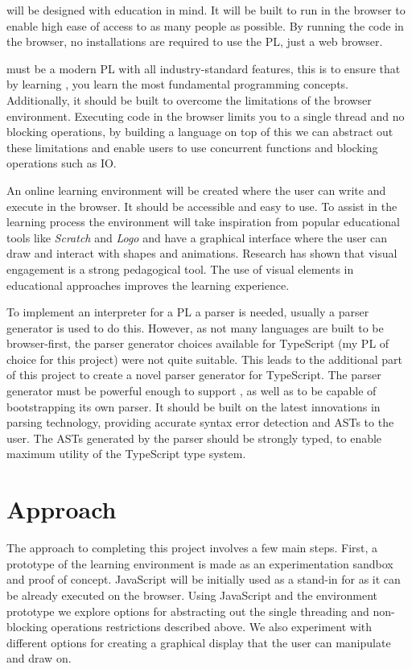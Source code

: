 \Setanta{} will be designed with education in mind.
It will be built to run in the browser to enable high ease of access to as many people as possible.
By running the code in the browser, no installations are required to use the PL, just a web browser.

\Setanta{} must be a modern PL with all industry-standard features, this is to ensure that by learning \Setanta{}, you learn the most fundamental programming concepts.
Additionally, it should be built to overcome the limitations of the browser environment.
Executing code in the browser limits you to a single thread and no blocking operations, by building a language on top of this we can abstract out these limitations and enable users to use concurrent functions and blocking operations such as IO.

An online learning environment will be created where the user can write and execute \Setanta{} in the browser.
It should be accessible and easy to use.
To assist in the learning process the environment will take inspiration from popular educational tools like \emph{Scratch} and \emph{Logo} and have a graphical interface where the user can draw and interact with shapes and animations.
Research has shown that visual engagement is a strong pedagogical tool. The use of visual elements in educational approaches improves the learning experience\cite{graphiclearning}.

To implement an interpreter for a PL a parser is needed, usually a parser generator is used to do this.
However, as not many languages are built to be browser-first, the parser generator choices available for TypeScript (my PL of choice for this project) were not quite suitable.
This leads to the additional part of this project to create a novel parser generator for TypeScript.
The parser generator must be powerful enough to support \Setanta{}, as well as to be capable of bootstrapping its own parser.
It should be built on the latest innovations in parsing technology, providing accurate syntax error detection and ASTs to the user.
The ASTs generated by the parser should be strongly typed, to enable maximum utility of the TypeScript type system.

\section{Approach}
The approach to completing this project involves a few main steps. First, a prototype of the learning environment is made as an experimentation sandbox and proof of concept. JavaScript will be initially used as a stand-in for \Setanta{} as it can be already executed on the browser. Using JavaScript and the environment prototype we explore options for abstracting out the single threading and non-blocking operations restrictions described above. We also experiment with different options for creating a graphical display that the user can manipulate and draw on.

